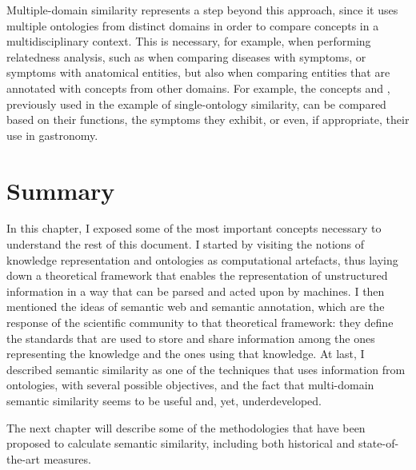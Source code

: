 Multiple-domain similarity represents a step beyond this approach, since it uses multiple ontologies from distinct domains in order to compare concepts in a multidisciplinary context. This is necessary, for example, when performing relatedness analysis, such as when comparing diseases with symptoms, or symptoms with anatomical entities, but also when comparing entities that are annotated with concepts from other domains. For example, the concepts  and , previously used in the example of single-ontology similarity, can be compared based on their functions, the symptoms they exhibit, or even, if appropriate, their use in gastronomy.


\section{Summary} \label{sec:concepts/summary}

In this chapter, I exposed some of the most important concepts necessary to understand the rest of this document. I started by visiting the notions of knowledge representation and ontologies as computational artefacts, thus laying down a theoretical framework that enables the representation of unstructured information in a way that can be parsed and acted upon by machines. I then mentioned the ideas of semantic web and semantic annotation, which are the response of the scientific community to that theoretical framework: they define the standards that are used to store and share information among the ones representing the knowledge and the ones using that knowledge. At last, I described semantic similarity as one of the techniques that uses information from ontologies, with several possible objectives, and the fact that multi-domain semantic similarity seems to be useful and, yet, underdeveloped.

The next chapter will describe some of the methodologies that have been proposed to calculate semantic similarity, including both historical and state-of-the-art measures.
